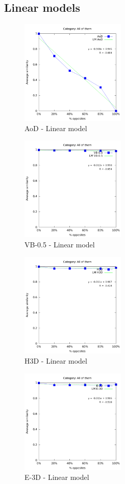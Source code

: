 \documentclass[a4paper,10pt]{article}
\begin{document}
\subsection{Linear models}
\begin{figure}[ht]{\centering
\includegraphics[height=5cm]{allcat_AoD_LM.pdf}
\caption{AoD - Linear model}
}\end{figure}
\begin{figure}[ht]{\centering
\includegraphics[height=5cm]{allcat_VB-0_5_LM.pdf}
\caption{VB-0.5 - Linear model}
}\end{figure}
\begin{figure}[ht]{\centering
\includegraphics[height=5cm]{allcat_H3D_LM.pdf}
\caption{H3D - Linear model}
}\end{figure}
\begin{figure}[ht]{\centering
\includegraphics[height=5cm]{allcat_E-3D_LM.pdf}
\caption{E-3D - Linear model}
}\end{figure}
\end{document}
